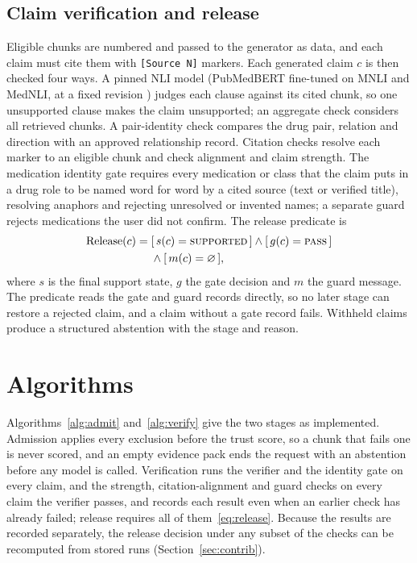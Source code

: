 \documentclass[conference]{IEEEtran}
\begin{document}
\subsection{Claim verification and release}

Eligible chunks are numbered and passed to the generator as data, and each claim must cite them with \texttt{[Source N]}
markers. Each generated claim $c$ is then checked four ways. A pinned NLI model (PubMedBERT fine-tuned on MNLI and MedNLI,
at a fixed revision \cite{gu2021pubmedbert,romanov2018mednli}) judges each clause against its cited chunk, so one
unsupported clause makes the claim unsupported; an aggregate check considers all retrieved chunks. A pair-identity
check compares the drug pair, relation and direction with an approved relationship record. Citation checks resolve each
marker to an eligible chunk and check alignment and claim strength. The medication identity gate requires every
medication or class that the claim puts in a drug role to be named word for word by a cited source (text or verified
title), resolving anaphors and rejecting unresolved or invented names; a separate guard rejects medications the user did
not confirm. The release predicate is
\begin{equation}
\begin{split}
\mathrm{Release}(c) = {}& [\,s(c) = \textsc{supported}\,] \wedge [\,g(c) = \textsc{pass}\,]\\
& \wedge [\,m(c) = \varnothing\,],
\end{split}
\label{eq:release}
\end{equation}
where $s$ is the final support state, $g$ the gate decision and $m$ the guard message. The predicate reads the gate and
guard records directly, so no later stage can restore a rejected claim, and a claim without a gate record fails.
Withheld claims produce a structured abstention with the stage and reason.




\section{Algorithms}
\label{sec:algo}

Algorithms~\ref{alg:admit} and~\ref{alg:verify} give the two stages as implemented. Admission applies every
exclusion before the trust score, so a chunk that fails one is never scored, and an empty evidence pack ends the
request with an abstention before any model is called. Verification runs the verifier and the identity gate on every
claim, and the strength, citation-alignment and guard checks on every claim the verifier passes, and records each
result even when an earlier check has already failed; release requires all of them~\eqref{eq:release}. Because the
results are recorded separately, the release decision under any subset of the checks can be recomputed from stored
runs (Section~\ref{sec:contrib}).
\end{document}
